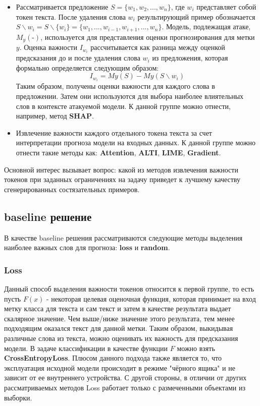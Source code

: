 \begin{itemize}
    \item Рассматривается предложение $S = \{w_1, w_2, ..., w_n\}$, где $w_i$ представляет собой токен текста. После удаления слова $w_i$ результирующий пример обозначается $S\backslash w_i = S\backslash\{w_i\} = \{w_1, ..., w_{i-1}, w_{i+1}, ..., w_n\}$. Модель, подлежащая атаке, $M_y(\text{-})$, используется для представления оценки прогнозирования для метки $y$. Оценка важности $I_{w_i}$ рассчитывается как разница между оценкой предсказания до и после удаления слова $w_i$ из предложения, которая формально определяется следующим образом:
    \begin{equation*}
        I_{w_i} = My(S) - My(S\backslash w_i)
    \end{equation*}
    Таким образом, получены оценки важности для каждого слова в предложении. Затем они используются для выбора наиболее влиятельных слов в контексте атакуемой модели. К данной группе можно отнести, например, метод \textbf{SHAP}.
    \item Извлечение важности каждого отдельного токена текста за счет интерпретации прогноза модели на входных данных. К данной группе можно отнести такие методы как: \textbf{Attention}, \textbf{ALTI}, \textbf{LIME}, \textbf{Gradient}.
\end{itemize}
Основной интерес вызывает вопрос: какой из методов извлечения важности токенов при заданных ограничениях на задачу приведет к лучшему качеству сгенерированных состязательных примеров.

\subsection{baseline решение}

\noindent\hspace{0.6cm}В качестве baseline решения рассматриваются следующие методы выделения наиболее важных слов для прогноза: \textbf{loss} и \textbf{random}.

\subsubsection{Loss}

\hspace{0.6cm}Данный способ выделения важности токенов относится к первой группе, то есть пусть $F(x)$ - некоторая целевая оценочная функция, которая принимает на вход метку класса для текста и сам текст и затем в качестве результата выдает скалярное значение. Чем выше/ниже значение этого результата, тем менее подходящим оказался текст для данной метки. Таким образом, выкидывая различные слова из текста, можно оценивать их важность для предсказания модели. В задаче классификации в качестве функции $F$ можно взять \textbf{CrossEntropyLoss}. Плюсом данного подхода также является то, что эксплуатация исходной модели происходит в режиме "чёрного ящика" и не зависит от ее внутреннего устройства. С другой стороны, в отличии от других рассматриваемых методов Loss работает только с размеченными объектами из выборки.

